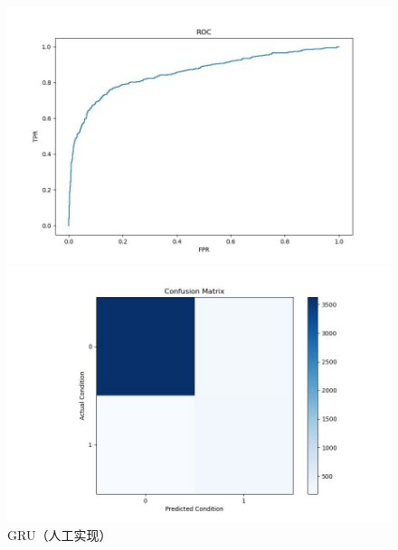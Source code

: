 \documentclass[UTF8]{article}
\begin{document}
\begin{figure}[h]
    \begin{minipage}{.48\linewidth}
        \centering
        \includegraphics[width=\linewidth]{../figure/GRUManual_ROC.jpg}
    \end{minipage}
    \begin{minipage}{.48    \linewidth}
        \centering
        \includegraphics[width=\linewidth]{../figure/GRUManual_Confusion.jpg}
    \end{minipage}
    \caption{GRU（人工实现）}
    \label{fig:GRUM}
\end{figure}
\end{document}
